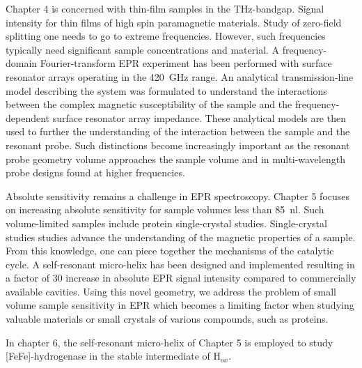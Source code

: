 Chapter 4 is concerned with thin-film samples in the THz-bandgap. Signal intensity for thin films of high spin paramagnetic materials. Study of zero-field splitting one needs to go to extreme frequencies. However, such frequencies typically need significant sample concentrations and material. A frequency-domain Fourier-transform EPR experiment has been performed with surface resonator arrays operating in the 420~GHz range. An analytical transmission-line model describing the system was formulated to understand the interactions between the complex magnetic susceptibility of the sample and the frequency-dependent surface resonator array impedance. These analytical models are then used to further the understanding of the interaction between the sample and the resonant probe. Such distinctions become increasingly important as the resonant probe geometry volume approaches the sample volume and in multi-wavelength probe designs found at higher frequencies. 

Absolute sensitivity remains a challenge in EPR spectroscopy. Chapter 5 focuses on increasing absolute sensitivity for sample volumes less than 85~nl. Such volume-limited samples include protein single-crystal studies. Single-crystal studies studies advance the understanding of the magnetic properties of a sample. From this knowledge, one can piece together the mechanisms of the catalytic cycle. A self-resonant micro-helix has been designed and implemented resulting in a factor of 30 increase in absolute EPR signal intensity compared to commercially available cavities. Using this novel geometry, we address the problem of small volume sample sensitivity in EPR which becomes a limiting factor when studying valuable materials or small crystals of various compounds, such as proteins. 

In chapter 6, the self-resonant micro-helix of Chapter 5 is employed to study [FeFe]-hydrogenase in the stable intermediate of H$_{ox}$. 







{\renewcommand{\bibsection}{\clearpage\section*{\bibname}\markboth{\bibname}{\bibname}}
\renewcommand{\bibname}{CHAPTER 1. REFERENCES}


}
